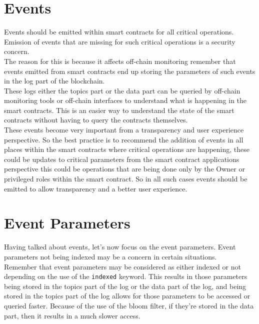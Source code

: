 \section{Events}

Events should be emitted within smart contracts for all critical operations. Emission of events that are missing for such critical operations is a security concern. \\

The reason for this is because it affects off-chain monitoring remember that events emitted from smart contracts end up storing the parameters of such events in the log part of the blockchain. \\

These logs either the topics part or the data part can be queried by off-chain monitoring tools or off-chain interfaces to understand what is happening in the smart contracts. This is an easier way to understand the state of the smart contracts without having to query the contracts themselves.\\

These events become very important from a transparency and user experience perspective. So the best practice is to recommend the addition of events in all places within the smart contracts where critical operations are happening, these could be updates to critical parameters from the smart contract applications perspective this could be operations that are being done only by the Owner or privileged roles within the smart contract. So in all such cases events should be emitted to allow transparency and a better user experience.

\section{Event Parameters}

Having talked about events, let's now focus on the event parameters. Event parameters not being indexed may be a concern in certain situations. \\

Remember that event parameters may be considered as either indexed or not depending on the use of the \texttt{indexed} keyword. This results in those parameters being stored in the topics part of the log or the data part of the log, and being stored in the topics part of the log allows for those parameters to be accessed or queried faster. Because of the use of the bloom filter, if they're stored in the data part, then it results in a much slower access.\\

